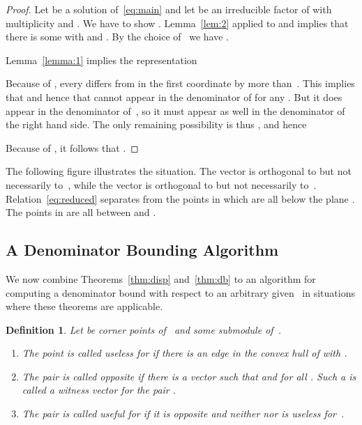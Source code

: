 \documentclass[a4paper]{sig-alternate}
\newtheorem{definition}{Definition}
\begin{document}
\begin{proof}
  Let  be a solution of~\eqref{eq:main} and let  be an irreducible
  factor of  with multiplicity  and .
  We have to show .
  Lemma~\ref{lem:2} applied to  and  implies that there is some 
  with  and .
  By the choice of~ we have .

  Lemma~\ref{lemma:1} implies the representation
  
  Because of , every  differs from  in the first coordinate
  by more than~. This implies that  and hence that  cannot appear in the denominator of
   for any . But it does appear in the denominator of~,
  so it must appear as well in the denominator of the right hand side.
  The only remaining possibility is thus
  ,
  and hence
  
  Because of , it follows that .
\end{proof}

The following figure illustrates the situation. The vector  is orthogonal to 
but not necessarily to~, while the vector  is orthogonal to  but not
necessarily to~.
Relation~\eqref{eq:reduced} separates  from the points in  which are all below
the plane . The points in  are all between  and .

\medskip
\centerline{}

\medskip

\subsection{A Denominator Bounding Algorithm}

We now combine Theorems~\ref{thm:disp} and~\ref{thm:db} to an algorithm
for computing a denominator bound with respect to an arbitrary given~
in situations where these theorems are applicable.

\begin{definition} Let  be corner points of~
  and  some submodule of~.
  \begin{enumerate}
  \item The point  is called \emph{useless} for  if there is an edge 
    in the convex hull of  with .
  \item The pair  is called \emph{opposite} if there is a vector 
    such that  and
     for all .
    Such a  is called a \emph{witness vector} for the pair .
  \item The pair  is called \emph{useful} for  if it is opposite and neither
     nor  is useless for~.
  \end{enumerate}
\end{definition}
\end{document}
